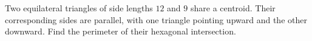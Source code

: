 Two equilateral triangles of side lengths $12$ and $9$ share a centroid. Their corresponding sides are parallel, with one triangle pointing upward and the other downward. Find the perimeter of their hexagonal intersection.
